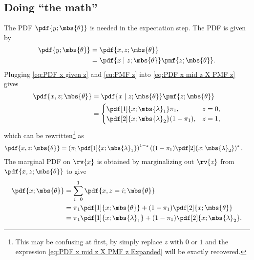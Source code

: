 \subsection*{Doing ``the math''}
The PDF $\pdf{y; \mbs{\theta}}$ is needed in the expectation step. The PDF is given by
\begin{align}
    \pdf{y; \mbs{\theta}} 
    &= \pdf{x, z; \mbs{\theta}}\\
    \label{eq:PDF x mid z X PMF z}
    &= \pdf{x \mid z; \mbs{\theta}}\pmf{z; \mbs{\theta}}.        
\end{align}
Plugging \eqref{eq:PDF x given z} and \eqref{eq:PMF z} into  \eqref{eq:PDF x mid z X PMF z} gives
\begin{align}
    \pdf{x, z; \mbs{\theta}}  &=
    \pdf{x \mid z; \mbs{\theta}}\pmf{z; \mbs{\theta}} \\
    \label{eq:PDF x mid z X PMF z Expanded}
    &=
    \begin{cases}
        \pdf[1]{x; \mbs{\lambda}_{1}}\pi_{1}, & z=0,\\
        \pdf[2]{x; \mbs{\lambda}_{2}}(1-\pi_{1}), & z=1,
    \end{cases}
\end{align}
which can be rewritten\footnote{This may be confusing at first, by simply replace $z$ with $0$ or $1$ and the expression \eqref{eq:PDF x mid z X PMF z Expanded} will be exactly recovered.} as
\begin{align}
    \pdf{x, z; \mbs{\theta}} 
    &= 
    \left(\pi_{1}\pdf[1]{x; \mbs{\lambda}_{1}}\right)^{1-z}\left( (1-\pi_{1})\pdf[2]{x; \mbs{\lambda}_{2}} \right)^{z}.
\end{align}
The marginal PDF on $\rv{x}$ is obtained by marginalizing out $\rv{z}$ from $\pdf{x, z;\mbs{\theta}}$ to give
\begin{align}
    \pdf{x; \mbs{\theta}} &= \sum_{i=0}^{1}\pdf{x, z=i; \mbs{\theta}}\\
    &= \pi_{1}\pdf[1]{x; \mbs{\theta}} + (1-\pi_{1})\pdf[2]{x; \mbs{\theta}}\\
    \label{eq:PDF x given theta Expanded}
    &= \pi_{1}\pdf[1]{x; \mbs{\lambda}_{1}} + (1-\pi_{1})\pdf[2]{x; \mbs{\lambda}_{2}}.
\end{align}

